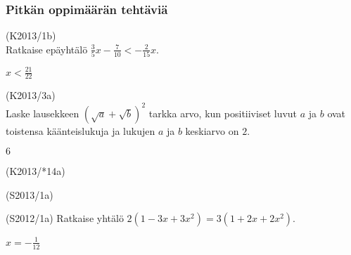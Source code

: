 \subsubsection*{Pitkän oppimäärän tehtäviä}

\begin{multicols}{2}

\begin{tehtava}
(K2013/1b) \\ Ratkaise epäyhtälö $\frac{3}{5}x-\frac{7}{10} < -\frac{2}{15}x$.
\begin{vastaus}
$x<\frac{21}{22}$
\end{vastaus}
\end{tehtava}

\begin{tehtava}
(K2013/3a) \\ Laske lausekkeen $(\sqrt{a}+\sqrt{b})^2$ tarkka arvo, kun positiiviset luvut $a$ ja $b$ ovat toistensa käänteislukuja ja lukujen $a$ ja $b$ keskiarvo on $2$.
\begin{vastaus}
$6$
\end{vastaus}
\end{tehtava}

\begin{tehtava}
(K2013/*14a) \\
\begin{vastaus}
\end{vastaus}
\end{tehtava}

\begin{tehtava}
(S2013/1a) \\
	\begin{vastaus}
	\end{vastaus}
\end{tehtava}

\begin{tehtava}
(S2012/1a) Ratkaise yhtälö $2(1-3x+3x^2) = 3(1+2x+2x^2)$.
\begin{vastaus}
$x=-\frac{1}{12}$
\end{vastaus}
\end{tehtava}


\end{multicols}
